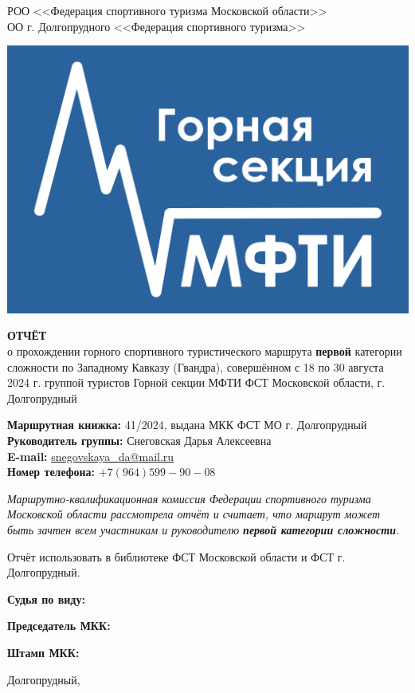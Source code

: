 \begin{titlepage}
\setlength\parindent{0pt}
	\begin{center}
		\large{РОО <<Федерация спортивного туризма Московской области>>\\
		ОО г. Долгопрудного <<Федерация спортивного туризма>>\\}
	\end{center}

	


	
	\begin{center}
		\includegraphics[width=0.4\linewidth]{../pics/Flag_GS-2}
		
		\Large{\bfseries{ОТЧЁТ}} \\
		\normalsize о прохождении горного спортивного туристического маршрута \textbf{первой} категории сложности по Западному Кавказу (Гвандра), совершённом с 18 по 30 августа 2024 г. группой туристов Горной секции МФТИ ФСТ Московской области, г. Долгопрудный
	\end{center}
	\vspace{1.5 cm}
	
	\textbf{Маршрутная книжка:} 41/2024, выдана МКК ФСТ МО г. Долгопрудный \\ 
	\textbf{Руководитель группы:} Снеговская Дарья Алексеевна\\
	\textbf{E-mail:} \href{mailto: snegovskaya\_da@mail.ru}{snegovskaya\_da@mail.ru}\\
	\textbf{Номер телефона:} $+7(964)599-90-08$
	
	\vspace{0.2cm}
	
	\textit{Маршрутно-квалификационная комиссия Федерации спортивного туризма Московской области рассмотрела отчёт и считает, что маршрут может быть зачтен всем участникам и руководителю \textbf{первой категории сложности}.}

	\vspace{0.2cm}
	
	Отчёт использовать в библиотеке ФСТ Московской области и ФСТ г. Долгопрудный.
	
	\vspace{1cm}
	
	\textbf{Судья по виду:}
	
	\vspace{0.5cm}
	\textbf{Председатель МКК:}
	
	\vspace{1cm}
	\textbf{Штамп МКК:}
	
	\vfill
	\begin{center}
		Долгопрудный,   \the\year{}
	\end{center}
\end{titlepage}
